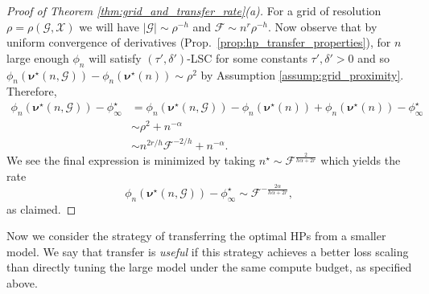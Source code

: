 \documentclass{article} %
\newcommand{\bhp}{\bm{\nu}}                       %
\newcommand{\searchspace}{\mathcal{X}}            %
\newcommand{\grid}{\mathcal{G}}                   %
\newcommand{\compexp}{r}
\newcommand{\gridres}{\rho}                       %
\newcommand{\gridresval}[2]{\gridres(#1, #2)}     %
\newcommand{\growthconst}{\tau}
\newcommand{\growthrad}{\delta}
\newcommand{\numhps}{h}
\newcommand{\flops}{\mathcal{F}}
\begin{document}
\begin{proof}[Proof of Theorem \ref{thm:grid_and_transfer_rate}(a)]
    For a grid of resolution $\gridres = \gridresval{\grid}{\searchspace}$ we will have $|\grid| \sim \gridres^{-\numhps}$ and $\flops \sim n^\compexp \gridres^{-\numhps}$. Now observe that by uniform convergence of derivatives (Prop.\ \ref{prop:hp_transfer_properties}), for $n$ large enough $\phi_n$ will satisfy $(\growthconst', \growthrad')$-LSC for some constants $\growthconst', \growthrad' > 0$ and so $\phi_n(\bhp^\star(n, \grid)) - \phi_n(\bhp^\star(n)) \sim \gridres^2$ by Assumption \ref{assump:grid_proximity}. Therefore,
    \begin{align*}
        \phi_n(\bhp^\star(n, \grid)) - \phi_\infty^\star &= \phi_n(\bhp^\star(n, \grid)) - \phi_n(\bhp^\star(n)) + \phi_n(\bhp^\star(n)) - \phi_\infty^\star\\ 
        &\sim \gridres^{2} + n^{-\alpha}\\
        &\sim n^{2 \compexp/ \numhps} \flops^{-2 / \numhps} + n^{-\alpha}.
    \end{align*}
    We see the final expression is minimized by taking $n^\star \sim \flops^{\frac{2}{\numhps \alpha + 2 \compexp}}$ which yields the rate
    \[
        \phi_n(\bhp^\star(n, \grid)) - \phi_\infty^\star \sim \flops^{-\frac{2\alpha }{\numhps \alpha + 2\compexp }},
    \]
    as claimed.
\end{proof}
Now we consider the strategy of transferring the optimal HPs from a smaller model. We say that transfer is \textit{useful} if this strategy achieves a better loss scaling than directly tuning the large model under the same compute budget, as specified above. 
\end{document}
